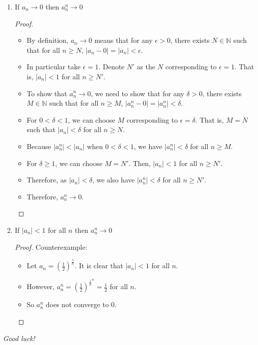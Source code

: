 \documentclass[10pt]{article}
\newcommand{\N}{\mathbb{N}}
\newenvironment{problem}[2][Problem]{\begin{trivlist}
\item[\hskip \labelsep {\bfseries #1}\hskip \labelsep {\bfseries #2.}]}{\end{trivlist}}
\begin{document}
\begin{problem}{4}
\begin{enumerate}
\begin{proof}
            \end{proof}
		\item If $ a_n \to 0 $ then $ a_n^n \to 0 $
            \begin{proof}
                \hfill
                \begin{itemize}
                    \item By definition, $a_n \to 0$ means that for any $\epsilon > 0$, there exists $N \in \N$ such that for all $n \geq N$, $|a_n - 0| = |a_n| < \epsilon$.
                    \item In particular take $\epsilon = 1$. Denote $N'$ as the $N$ corresponding to $\epsilon = 1$.
                        That is, $|a_n| < 1$ for all $n \geq N'$.
                    \item To show that $a_n^n \to 0$, we need to show that for any $\delta> 0$, there exists $M \in \N$ such that for all $n \geq M$, $|a_n^n - 0| = |a_n^n| < \delta$.
                    \item For $0 < \delta < 1$, we can choose $M$ corresponding to $\epsilon = \delta$.
                        That is, $M = N$ such that $|a_n| < \delta$ for all $n \geq N$.
                    \item Because $|a_n^n| < |a_n|$ when $0 < \delta < 1$, we have $|a_n^n| < \delta$ for all $n \geq M$.
                    \item For $\delta \geq 1$, we can choose $M = N'$. Then, $|a_n| < 1$ for all $n \geq N'$.
                    \item Therefore, as $|a_n| < \delta$, we also have $|a_n^n| < \delta$ for all $n \geq N'$.
                    \item Therefore, $a_n^n \to 0$.
                \end{itemize}
            \end{proof}
		\item If $ |a_n|<1 $ for all $ n $ then $ a_n^n \to 0 $
            \begin{proof}
                Counterexample:
                \begin{itemize}
                    \item Let $a_n = \left(\frac{1}{2}\right)^\frac{1}{n}$. It is clear that $|a_n| < 1$ for all $n$.
                    \item However, $a_n^n = \left(\frac{1}{2}\right)^{\frac{1}{n}^n} = \frac{1}{2}$ for all $n$.
                    \item So $a_n^n$ does not converge to $0$.
                \end{itemize}
            \end{proof}
	\end{enumerate}
\end{problem}

\vspace{3cm}\hfill \emph{Good luck!}
\end{document}
